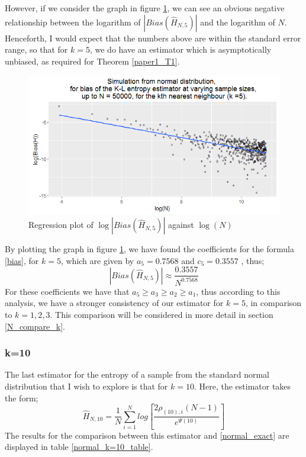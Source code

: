 \documentclass{article}
\begin{document}
However, if we consider the graph in figure \ref{normal_k=5_graph}, we can see an obvious negative relationship between the logarithm of $|Bias(\hat{H}_{N, 5})|$ and the logarithm of $N$. Henceforth, I would expect that the numbers above are within the standard error range, so that for $k=5$, we do have an estimator which is asymptotically unbiased, as required for Theorem \ref{paper1_T1}.

\begin{figure}
  \begin{center}
    \includegraphics[width=\textwidth]{./Graphs/Normal_k=5_plot.png}
  \end{center} 
\caption{Regression plot of $\log|Bias(\hat{H}_{N, 5})|$ against $\log(N)$}
  \label{normal_k=5_graph}
\end{figure}

By plotting the graph in figure \ref{normal_k=5_graph}, we have found the coefficients for the formula \ref{bias}, for $k=5$, which are given by $a_{5} = 0.7568$ and $c_{5} = 0.3557$ , thus;
\begin{equation}
|Bias(\hat{H}_{N, 5})| \approx \frac{0.3557}{N^{0.7568}} \nonumber
\end{equation}
For these coefficients we have that $a_{5} \geq a_{3} \geq a_{2} \geq a_{1}$, thus according to this analysis, we have a stronger consistency of our estimator for $k=5$, in comparison to $k=1, 2, 3$. This comparison will be considered in more detail in section \ref{N_compare_k}.




\subsubsection{k=10} \label{N_k=10}
The last estimator for the entropy of a sample from the standard normal distribution that I wish to explore is that for $k=10$. Here, the estimator takes the form;
\begin{equation}
\hat{H}_{N, 10} = \frac{1}{N} \sum_{i=1}^{N} log \left[ \frac{2\rho_{(10),i}(N-1)}{e^{\Psi(10)}} \right] \nonumber
\end{equation}
The results for the comparison between this estimator and \ref{normal_exact} are displayed in table \ref{normal_k=10_table}.
\end{document}
